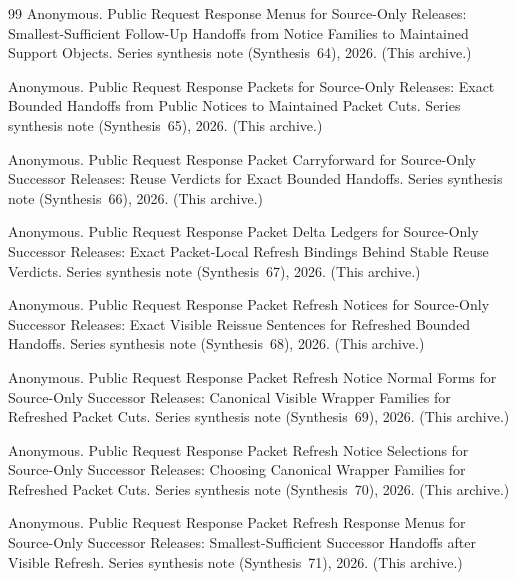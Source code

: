 \documentclass[11pt]{article}
\begin{document}
\begin{thebibliography}{99}
Anonymous.
\newblock Public Request Response Menus for Source-Only Releases: Smallest-Sufficient Follow-Up Handoffs from Notice Families to Maintained Support Objects.
\newblock Series synthesis note (Synthesis~64), 2026. (This archive.)

Anonymous.
\newblock Public Request Response Packets for Source-Only Releases: Exact Bounded Handoffs from Public Notices to Maintained Packet Cuts.
\newblock Series synthesis note (Synthesis~65), 2026. (This archive.)

Anonymous.
\newblock Public Request Response Packet Carryforward for Source-Only Successor Releases: Reuse Verdicts for Exact Bounded Handoffs.
\newblock Series synthesis note (Synthesis~66), 2026. (This archive.)

Anonymous.
\newblock Public Request Response Packet Delta Ledgers for Source-Only Successor Releases: Exact Packet-Local Refresh Bindings Behind Stable Reuse Verdicts.
\newblock Series synthesis note (Synthesis~67), 2026. (This archive.)

Anonymous.
\newblock Public Request Response Packet Refresh Notices for Source-Only Successor Releases: Exact Visible Reissue Sentences for Refreshed Bounded Handoffs.
\newblock Series synthesis note (Synthesis~68), 2026. (This archive.)

Anonymous.
\newblock Public Request Response Packet Refresh Notice Normal Forms for Source-Only Successor Releases: Canonical Visible Wrapper Families for Refreshed Packet Cuts.
\newblock Series synthesis note (Synthesis~69), 2026. (This archive.)

Anonymous.
\newblock Public Request Response Packet Refresh Notice Selections for Source-Only Successor Releases: Choosing Canonical Wrapper Families for Refreshed Packet Cuts.
\newblock Series synthesis note (Synthesis~70), 2026. (This archive.)

Anonymous.
\newblock Public Request Response Packet Refresh Response Menus for Source-Only Successor Releases: Smallest-Sufficient Successor Handoffs after Visible Refresh.
\newblock Series synthesis note (Synthesis~71), 2026. (This archive.)


\end{thebibliography}
\end{document}
